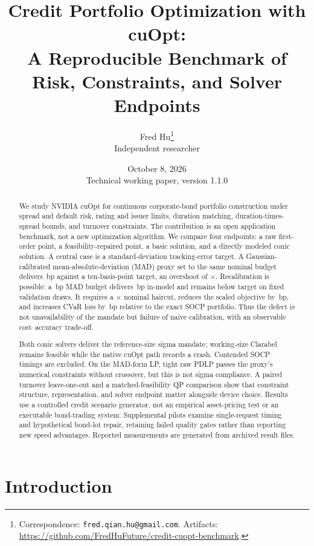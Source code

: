 \documentclass[11pt,a4paper]{article}
\title{Credit Portfolio Optimization with cuOpt:\\
       A Reproducible Benchmark of Risk, Constraints, and Solver Endpoints}
\author{Fred Hu\thanks{Correspondence: \texttt{fred.qian.hu@gmail.com}. Artifacts:
\url{https://github.com/FredHuFuture/credit-cuopt-benchmark}.}\\
\small Independent researcher}
\date{October 8, 2026\\\small Technical working paper, version 1.1.0}
\begin{document}
\maketitle

\begin{abstract}
We study NVIDIA cuOpt for continuous corporate-bond portfolio construction
under spread and default risk, rating and issuer limits, duration matching,
duration-times-spread bounds, and turnover constraints. The contribution is
an open application benchmark, not a new optimization algorithm. We compare
four endpoints: a raw first-order point, a feasibility-repaired point, a basic
solution, and a directly modeled conic solution. A central case is a
standard-deviation tracking-error target. A Gaussian-calibrated
mean-absolute-deviation (MAD) proxy set to the same nominal budget delivers
\PZeroNaiveMadSigmaBp\,bp against a ten-basis-point target, an overshoot of
\PZeroNaiveMadOvershoot$\times$. Recalibration is possible: a
\PZeroSelectedMadBudgetBp\,bp MAD budget delivers
\PZeroSelectedMadSigmaBp\,bp in-model and remains below target on
\PZeroValidationDrawCount{} fixed validation draws. It requires a
\PZeroSelectedMadHaircut$\times$ nominal haircut, reduces the scaled objective
by \PZeroSelectedMadObjectiveLossBp\,bp, and increases CVaR loss by
\PZeroSelectedMadCvarCostBp\,bp relative to the exact SOCP portfolio.
Thus the defect is not unavailability of the mandate but failure of naive
calibration, with an observable cost--accuracy trade-off.

Both conic solvers deliver the reference-size sigma mandate; working-size
Clarabel remains feasible while the native cuOpt path records a crash.
Contended SOCP timings are excluded. On the MAD-form LP, tight raw PDLP passes
the proxy's numerical constraints without crossover, but this is not sigma
compliance. A paired turnover leave-one-out and a matched-feasibility QP
comparison show that constraint structure, representation, and solver endpoint
matter alongside device choice. Results use a controlled credit scenario
generator, not an empirical asset-pricing test or an executable bond-trading
system. Supplemental pilots examine single-request timing and hypothetical
bond-lot repair, retaining failed quality gates rather than reporting new
speed advantages. Reported measurements are generated from archived result files.
\end{abstract}

\section{Introduction}
\end{document}
